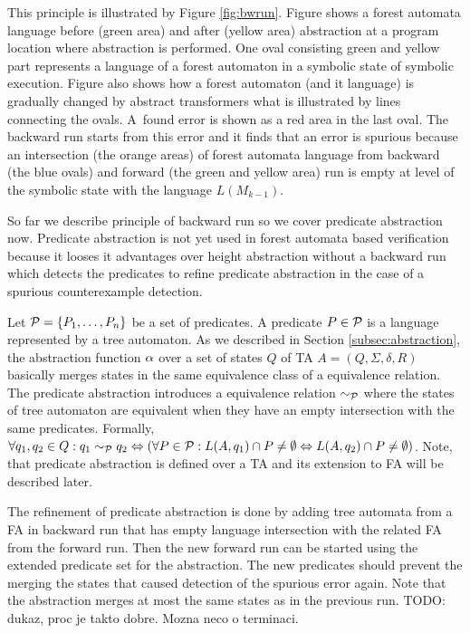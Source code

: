 This principle is illustrated by Figure \ref{fig:bwrun}.
Figure shows a forest automata language before (green area)
and after (yellow area) abstraction at a program location where abstraction is performed.
One oval consisting green and yellow part represents a language of a forest automaton
in a symbolic state of symbolic execution.
Figure also shows how a forest automaton (and it language) is gradually changed
by abstract transformers what is illustrated by lines connecting the ovals.
A~found error is shown as a red area in the last oval.
The backward run starts from this error and it finds
that an error is spurious because an intersection (the orange areas) of
forest automata language from backward (the blue ovals) and forward
(the green and yellow area) run is empty at level of the symbolic state
with the language $L(M_{k-1})$.

So far we describe principle of backward run so we cover
predicate abstraction now.
Predicate abstraction is not yet used in forest automata based verification
because it looses it advantages over height abstraction without
a backward run which detects the predicates to refine predicate abstraction
in the case of a spurious counterexample detection.

Let $\mathcal{P}=\{P_1, \ldots, P_n\}$ be a set of predicates.
A predicate $P \in \mathcal{P}$ is a language represented by
a tree automaton.
As we described in Section \ref{subsec:abstraction}, the abstraction function $\alpha$
over a set of states $Q$ of TA $A=(Q,\Sigma,\delta, R)$ basically
merges states in the same equivalence class of a equivalence relation.
The predicate abstraction introduces a equivalence relation $\sim_{\mathcal{P}}$
where the states of tree automaton are equivalent when
they have an empty intersection with the same predicates.
Formally, $\forall q_1,q_2 \in Q: q_1 \sim_{\mathcal{P}} q_2 \Leftrightarrow
(\forall P \in \mathcal{P}: L(A,q_1) \cap P \neq \emptyset
\Leftrightarrow L(A,q_2) \cap P \neq \emptyset)$.
Note, that predicate abstraction is defined over a TA
and its extension to FA will be described later.

The refinement of predicate abstraction is done by adding
tree automata from a FA in backward run that has empty language
intersection with the related FA from the forward run.
Then the new forward run can be started using the extended predicate
set for the abstraction.
The new predicates should prevent the merging the states that caused
detection of the spurious error again.
Note that the abstraction merges at most the same states as
in the previous run.
TODO: dukaz, proc je takto dobre.
Mozna neco o terminaci.

